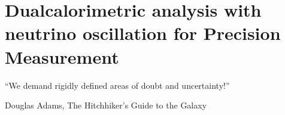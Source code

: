 \documentclass[../main.tex]{subfiles}
\begin{document}
\chapter{Dualcalorimetric analysis with neutrino oscillation for Precision Measurement}
\label{sec:joint_fit}

\epigraph{``We demand rigidly defined areas of doubt and uncertainty!''}{Douglas Adams, The Hitchhiker’s Guide to the Galaxy}

\minitoc

%
%
%
%
%
%
%
\end{document}
